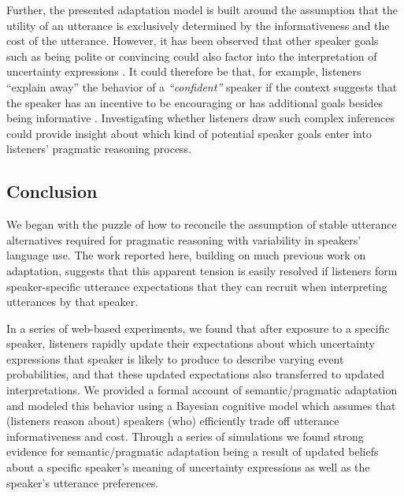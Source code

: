 \documentclass[man, floatsintext]{apa6}
\begin{document}

Further, the presented adaptation model is built around the assumption that the utility of an utterance is exclusively determined
by the informativeness and the cost of the utterance. However, it has been observed that other speaker goals such as being polite or
convincing could also factor into the interpretation of uncertainty expressions \parencite[see e.g,][]{Pighin2011,Juanchich2013,Holtgraves2016}.
It could therefore be that, for example, listeners ``explain away'' the behavior of a \textit{``confident''} speaker if the context suggests that the speaker
has an incentive to be encouraging or has additional goals besides being informative \parencite[see also][]{Yoon2016,Yoon2017}. Investigating whether listeners draw such complex inferences
could provide  insight about which kind of potential speaker goals enter into listeners' pragmatic reasoning process.


\subsection{Conclusion}

We began with the puzzle of how to reconcile the assumption of stable utterance alternatives required for pragmatic reasoning with variability in speakers'  language use. The work reported here, building on much previous work on adaptation, suggests that this apparent tension is easily resolved if listeners form speaker-specific utterance expectations that they can recruit when interpreting utterances by that speaker.

In a series of web-based experiments, we found that after exposure to a specific speaker, listeners rapidly update 
their expectations about which uncertainty expressions that speaker is likely to produce
to describe varying event probabilities, and that these updated expectations also transferred to updated interpretations.
We provided a formal account of semantic/pragmatic adaptation and modeled this behavior using a Bayesian cognitive model 
which assumes that (listeners reason about) speakers (who) efficiently trade off utterance informativeness and cost.
Through a series of simulations we found strong evidence for semantic/pragmatic adaptation being a result of
updated beliefs about a specific speaker's meaning of uncertainty expressions as well as the speaker's utterance
preferences. 



\printbibliography
\end{document}
